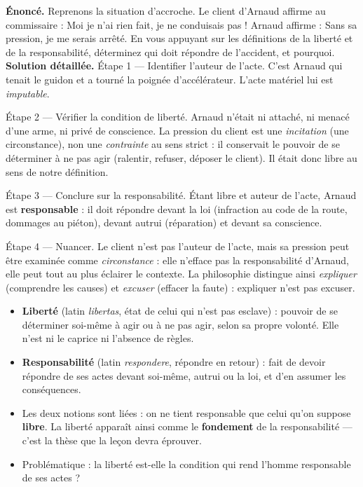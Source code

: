 \documentclass[11pt]{article}
\begin{document}
\begin{exoresolu}
\textbf{Énoncé.} Reprenons la situation d'accroche. Le client d'Arnaud affirme au commissaire : \og Moi je n'ai rien fait, je ne conduisais pas ! \fg{} Arnaud affirme : \og Sans sa pression, je me serais arrêté. \fg{} En vous appuyant sur les définitions de la liberté et de la responsabilité, déterminez qui doit répondre de l'accident, et pourquoi.
\tcblower
\textbf{Solution détaillée.}
Étape 1 — Identifier l'auteur de l'acte. C'est Arnaud qui tenait le guidon et a tourné la poignée d'accélérateur. L'acte matériel lui est \emph{imputable}.

Étape 2 — Vérifier la condition de liberté. Arnaud n'était ni attaché, ni menacé d'une arme, ni privé de conscience. La pression du client est une \emph{incitation} (une circonstance), non une \emph{contrainte} au sens strict : il conservait le pouvoir de se déterminer à ne pas agir (ralentir, refuser, déposer le client). Il était donc libre au sens de notre définition.

Étape 3 — Conclure sur la responsabilité. Étant libre et auteur de l'acte, Arnaud est \textbf{responsable} : il doit répondre devant la loi (infraction au code de la route, dommages au piéton), devant autrui (réparation) et devant sa conscience.

Étape 4 — Nuancer. Le client n'est pas l'auteur de l'acte, mais sa pression peut être examinée comme \emph{circonstance} : elle n'efface pas la responsabilité d'Arnaud, elle peut tout au plus éclairer le contexte. La philosophie distingue ainsi \emph{expliquer} (comprendre les causes) et \emph{excuser} (effacer la faute) : expliquer n'est pas excuser.
\end{exoresolu}

\begin{aretenir}
\begin{itemize}
\item \textbf{Liberté} (latin \emph{libertas}, état de celui qui n'est pas esclave) : pouvoir de se déterminer soi-même à agir ou à ne pas agir, selon sa propre volonté. Elle n'est ni le caprice ni l'absence de règles.
\item \textbf{Responsabilité} (latin \emph{respondere}, répondre en retour) : fait de devoir répondre de ses actes devant soi-même, autrui ou la loi, et d'en assumer les conséquences.
\item Les deux notions sont liées : on ne tient responsable que celui qu'on suppose \textbf{libre}. La liberté apparaît ainsi comme le \textbf{fondement} de la responsabilité — c'est la thèse que la leçon devra éprouver.
\item Problématique : la liberté est-elle la condition qui rend l'homme responsable de ses actes ?
\end{itemize}
\end{aretenir}
\end{document}
